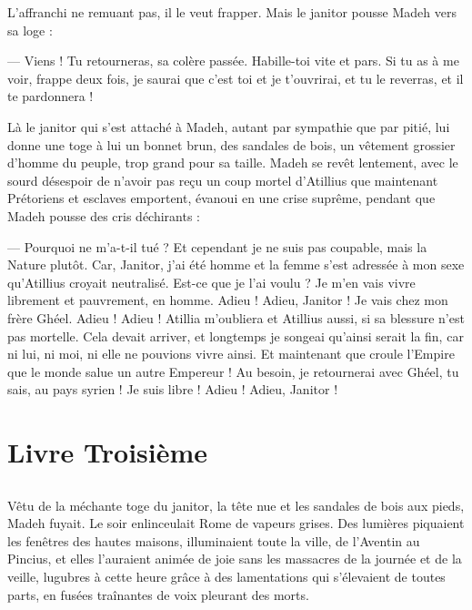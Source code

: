 \documentclass[a4paper, 11pt, oneside, polutonikogreek, french]{article}
\begin{document}
L'affranchi ne remuant pas, il le veut frapper. Mais le janitor pousse Madeh vers sa loge :

--- Viens ! Tu retourneras, sa colère passée. Habille-toi vite et pars. Si tu as à me voir, frappe deux fois, je saurai que c'est toi et je t'ouvrirai, et tu le reverras, et il te pardonnera !

Là le janitor qui s'est attaché à Madeh, autant par sympathie que par pitié, lui donne une toge à lui un bonnet brun, des sandales de bois, un vêtement grossier d'homme du peuple, trop grand pour sa taille. Madeh se revêt lentement, avec le sourd désespoir de n'avoir pas reçu un coup mortel d'Atillius que maintenant Prétoriens et esclaves emportent, évanoui en une crise suprême, pendant que Madeh pousse des cris déchirants :

--- Pourquoi ne m'a-t-il tué ? Et cependant je ne suis pas coupable, mais la Nature plutôt. Car, Janitor, j'ai été homme et la femme s'est adressée à mon sexe qu'Atillius croyait neutralisé. Est-ce que je l'ai voulu ? Je m'en vais vivre librement et pauvrement, en homme. Adieu ! Adieu, Janitor ! Je vais chez mon frère Ghéel. Adieu ! Adieu ! Atillia m'oubliera et Atillius aussi, si sa blessure n'est pas mortelle. Cela devait arriver, et longtemps je songeai qu'ainsi serait la fin, car ni lui, ni moi, ni elle ne pouvions vivre ainsi. Et maintenant que croule l'Empire que le monde salue un autre Empereur ! Au besoin, je retournerai avec Ghéel, tu sais, au pays syrien ! Je suis libre ! Adieu ! Adieu, Janitor !
\clearpage
\section{Livre Troisième}
\subsection{}
\paragraph{}
Vêtu de la méchante toge du janitor, la tête nue et les sandales de bois aux pieds, Madeh fuyait. Le soir enlinceulait Rome de vapeurs grises. Des lumières piquaient les fenêtres des hautes maisons, illuminaient toute la ville, de l'Aventin au Pincius, et elles l'auraient animée de joie sans les massacres de la journée et de la veille, lugubres à cette heure grâce à des lamentations qui s'élevaient de toutes parts, en fusées traînantes de voix pleurant des morts.
\end{document}
